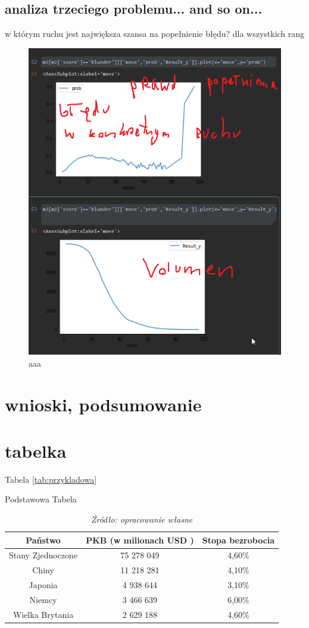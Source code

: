 \documentclass[inzynierska]{pwr_wmat_praca_dyplomowa}
\theoremstyle{plain}
\numberwithin{theorem}{chapter}
\theoremstyle{definition}
\numberwithin{theorem}{chapter}
\begin{document}
\section{analiza trzeciego problemu...  and so on...}
w którym ruchu jest największa szansa na popełnienie błędu?
dla wszystkich rang
\begin{figure}[H]
	\centering
	\includegraphics[width=\textwidth]{p_od_ruchu.png}
	\caption{aaa}\label{aaa}
\end{figure}
\chapter{wnioski, podsumowanie}

\chapter{tabelka}
Tabela \ref{tab:przykladowa} 
\begin{table}[H]
	\caption{Podstawowa Tabela}
	\centering
	\begin{tabular}{ccc}
		\hline
		\hline                       
		Państwo & PKB (w milionach USD )& Stopa bezrobocia  \\  [0.5ex] 
		\hline 
		Stany Zjednoczone & 75 278 049 & 4,60\%  \\
		Chiny & 11 218 281 & 4,10\%   \\
		Japonia & 4 938 644 & 3,10\%  \\
		Niemcy & 3 466 639 & 6,00\%   \\
		Wielka Brytania & 2 629 188 & 4,60\%  \\ [1ex]  
		\hline 
	\end{tabular}
	\caption*{\textit{Źródło: opracowanie własne}}
	\label{tab:przykladowa2} 
\end{table}
\end{document}
